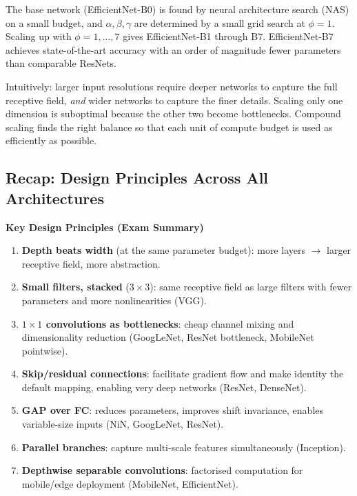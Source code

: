 \documentclass[11pt,a4paper]{article}
\begin{document}
The base network (EfficientNet-B0) is found by neural architecture search (NAS) on a small budget,
and $\alpha, \beta, \gamma$ are determined by a small grid search at $\phi=1$.  Scaling up with
$\phi = 1, \ldots, 7$ gives EfficientNet-B1 through B7.  EfficientNet-B7 achieves state-of-the-art
accuracy with an order of magnitude fewer parameters than comparable ResNets.

\begin{insightbox}
Intuitively: larger input resolutions require deeper networks to capture the full receptive field,
\emph{and} wider networks to capture the finer details.  Scaling only one dimension is suboptimal
because the other two become bottlenecks.  Compound scaling finds the right balance so that each
unit of compute budget is used as efficiently as possible.
\end{insightbox}

\subsection{Recap: Design Principles Across All Architectures}

\begin{tcolorbox}[colback=WarningRedBg,colframe=WarningRed,boxrule=0.8pt,arc=3pt]
\textbf{Key Design Principles (Exam Summary)}
\begin{enumerate}
  \item \textbf{Depth beats width} (at the same parameter budget): more layers $\to$ larger receptive field, more abstraction.
  \item \textbf{Small filters, stacked} ($3\times3$): same receptive field as large filters with fewer parameters and more nonlinearities (VGG).
  \item \textbf{$1\times1$ convolutions as bottlenecks}: cheap channel mixing and dimensionality reduction (GoogLeNet, ResNet bottleneck, MobileNet pointwise).
  \item \textbf{Skip/residual connections}: facilitate gradient flow and make identity the default mapping, enabling very deep networks (ResNet, DenseNet).
  \item \textbf{GAP over FC}: reduces parameters, improves shift invariance, enables variable-size inputs (NiN, GoogLeNet, ResNet).
  \item \textbf{Parallel branches}: capture multi-scale features simultaneously (Inception).
  \item \textbf{Depthwise separable convolutions}: factorised computation for mobile/edge deployment (MobileNet, EfficientNet).
\end{enumerate}
\end{tcolorbox}
\end{document}

